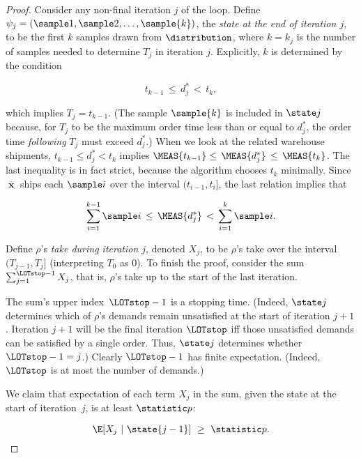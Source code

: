 \begin{proof}
  Consider any non-final iteration $j$ of the loop.
  Define $\psi_j = (\sample 1, \sample 2, \ldots, \sample {k})$,
  the {\em state at the end of iteration $j$},
  to be the first $k$ samples drawn from $\distribution$,
  where $k=k_j$ is the number of samples
  needed to determine $T_j$ in iteration $j$.
  Explicitly, $k$ is determined by the condition

  \begin{equation}\label{eqn:kjt}
    t_{k-1}\,\le\, d^*_j\, <\, t_{k},
  \end{equation}

\noindent
  which implies $T_j = t_{k-1}$.
  (The sample $\sample {k}$ is included in $\state j$ because,
  for $T_j$ to be the maximum order time less than or equal to $d^*_j$,
  the order time {\em following} $T_j$ must exceed $d^*_j$.)
  When we look at the related warehouse shipments, 
  $t_{k-1} \leq d^*_j < t_k$ implies $\MEAS{t_{k-1}} \leq\, \MEAS{d^*_j} \, 
  \leq\, \MEAS{t_k}$. 
  The last inequality is in fact strict, 
  because the algorithm chooses $t_k$ minimally.
  Since $\overline\mbfx$ ships each $\sample i$ over the interval $(t_{i-1},t_i]$,
  the last relation implies that

  \begin{equation}\label{eqn:kj}
  \sum_{i=1}^{k-1} \sample i\,\le\, \MEAS{d^*_j}\, <\, \sum_{i=1}^{k} \sample i.
  \end{equation}
	
  Define $\rho$'s {\em take during iteration $j$},
  denoted $X_j$, to be $\rho$'s take over the interval $(T_{j-1},T_j]$
  (interpreting $T_0$ as 0).
  To finish the proof,  consider the sum $\sum_{j=1}^{\LOTstop-1} X_j$,
  that is, $\rho$'s take up to the start of the last iteration.

  The sum's upper index~$\LOTstop - 1$ is a stopping time.
  (Indeed, $\state j$ determines 
  which of $\rho$'s demands remain unsatisfied at the start of iteration $j+1$.
  Iteration $j+1$ will be the final iteration $\LOTstop$
  iff those unsatisfied demands can be satisfied by a single order.
  Thus, $\state j$ determines whether $\LOTstop - 1 = j$.)
  Clearly $\LOTstop-1$ has finite expectation.
  (Indeed, $\LOTstop$ is at most the number of demands.)

  We claim that expectation of each term $X_j$ in the sum,
  given the state at the start of iteration~$j$, is at least $\statistic p$:

  \begin{equation}\label{eqn:claim}
    \E[X_{j}~|~\state {j-1}]~\ge~ \statistic p.
  \end{equation}


\end{proof}
